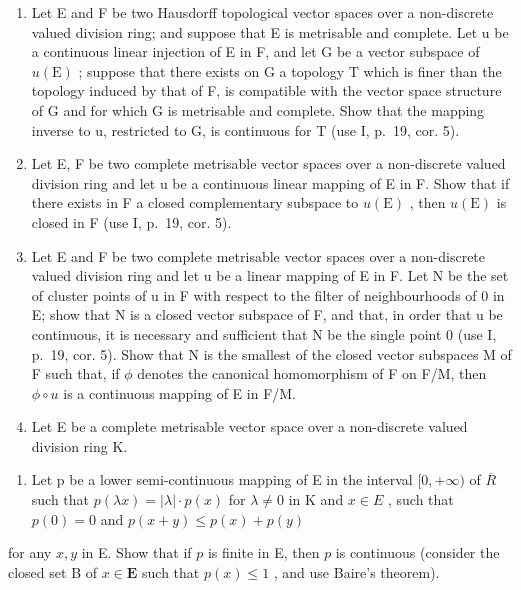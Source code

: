 \begin{enumerate}
\def\labelenumi{\arabic{enumi})}
\setcounter{enumi}{2}
\item
  Let E and F be two Hausdorff topological vector spaces over a non-discrete valued division ring; and suppose that E is metrisable and complete. Let u be a continuous linear injection of E in F, and let G be a vector subspace of \(u(\mathrm{E})\) ; suppose that there exists on G a topology T which is finer than the topology induced by that of F, is compatible with the vector space structure of G and for which G is metrisable and complete. Show that the mapping inverse to u, restricted to G, is continuous for T (use I, p.~19, cor. 5).
\item
  Let E, F be two complete metrisable vector spaces over a non-discrete valued division ring and let u be a continuous linear mapping of E in F. Show that if there exists in F a closed complementary subspace to \(u(\mathrm{E})\) , then \(u(\mathrm{E})\) is closed in F (use I, p.~19, cor. 5).
\item
  Let E and F be two complete metrisable vector spaces over a non-discrete valued division ring and let u be a linear mapping of E in F. Let N be the set of cluster points of u in F with respect to the filter of neighbourhoods of 0 in E; show that N is a closed vector subspace of F, and that, in order that u be continuous, it is necessary and sufficient that N be the single point 0 (use I, p.~19, cor. 5). Show that N is the smallest of the closed vector subspaces M of F such that, if \(\phi\) denotes the canonical homomorphism of F on F/M, then \(\phi \circ u\) is a continuous mapping of E in F/M.
\item
  Let E be a complete metrisable vector space over a non-discrete valued division ring K.
\end{enumerate}

\begin{enumerate}
\def\labelenumi{\alph{enumi})}
\tightlist
\item
  Let p be a lower semi-continuous mapping of E in the interval \([0, +\infty)\) of \(\overline{R}\) such that \(p(\lambda x) = |\lambda| \cdot p(x)\) for \(\lambda \neq 0\) in K and \(x \in E\) , such that \(p(0) = 0\) and \(p(x + y) \leqslant p(x) + p(y)\)
\end{enumerate}

for any \(x, y\) in E. Show that if \(p\) is finite in E, then \(p\) is continuous (consider the closed set B of \(x \in \mathbf{E}\) such that \(p(x) \leqslant 1\) , and use Baire's theorem).

